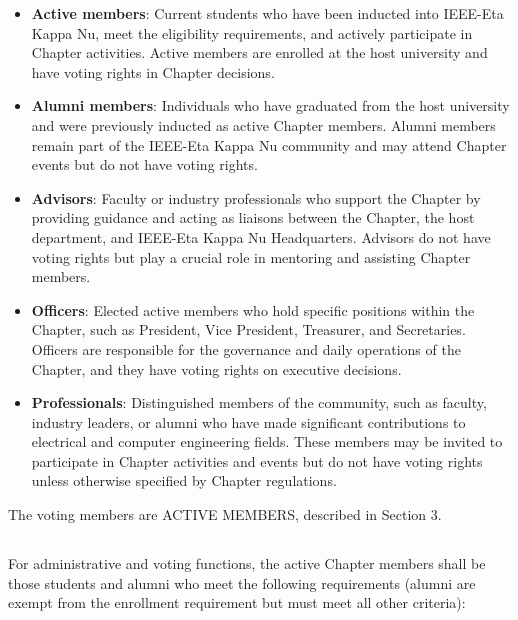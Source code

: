 \documentclass[10pt, oneside]{article}
\begin{document}
\begin{itemize}
    \item \textbf{Active members}: Current students who have been inducted into IEEE-Eta Kappa Nu, meet the eligibility requirements, and actively participate in Chapter activities. Active members are enrolled at the host university and have voting rights in Chapter decisions.

    \item \textbf{Alumni members}: Individuals who have graduated from the host university and were previously inducted as active Chapter members. Alumni members remain part of the IEEE-Eta Kappa Nu community and may attend Chapter events but do not have voting rights.

    \item \textbf{Advisors}: Faculty or industry professionals who support the Chapter by providing guidance and acting as liaisons between the Chapter, the host department, and IEEE-Eta Kappa Nu Headquarters. Advisors do not have voting rights but play a crucial role in mentoring and assisting Chapter members.

    \item \textbf{Officers}: Elected active members who hold specific positions within the Chapter, such as President, Vice President, Treasurer, and Secretaries. Officers are responsible for the governance and daily operations of the Chapter, and they have voting rights on executive decisions.

    \item \textbf{Professionals}: Distinguished members of the community, such as faculty, industry leaders, or alumni who have made significant contributions to electrical and computer engineering fields. These members may be invited to participate in Chapter activities and events but do not have voting rights unless otherwise specified by Chapter regulations.
\end{itemize}
The voting members are ACTIVE MEMBERS, described in Section 3.


\subsection{}
For administrative and voting functions, the active Chapter members shall be those students and alumni who meet the following requirements (alumni are exempt from the enrollment requirement but must meet all other criteria):
\end{document}
